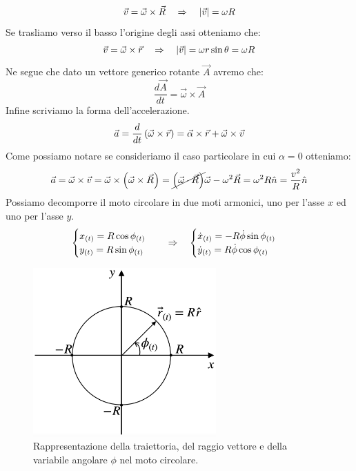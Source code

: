 \begin{equation}
    \vec v = \vec\omega\times\vec R\quad\Rightarrow\quad \left| \vec v \right|  = \omega R
\end{equation}
Se trasliamo verso il basso l'origine degli assi otteniamo che:
\begin{equation}
    \vec v = \vec\omega\times\vec r\quad\Rightarrow\quad \left| \vec v \right|  = \omega r\sin\theta = \omega R
\label{eq:v(w)}
\end{equation}
Ne segue che dato un vettore generico rotante $\vec A$ avremo che:
\begin{equation}
    \frac{d\vec A}{dt} = \vec\omega\times\vec A
\label{eq:rotantvector}
\end{equation}
Infine scriviamo la forma dell'accelerazione.
\begin{equation}
    \vec a = \frac d{dt}\left(\vec\omega\times\vec r\right) =
    \vec \alpha\times \vec r + \vec\omega\times\vec v
\label{eq:a_vec}
\end{equation}
Come possiamo notare se consideriamo il caso particolare in cui $\alpha = 0$
otteniamo:
\begin{equation}
    \vec a = \vec \omega\times\vec v = \vec \omega\times\left( \vec\omega\times
    \vec R\right) = \cancel{\left(\vec\omega\cdot\vec R\right)}\vec\omega - \omega^2\vec R
    = \omega^2R\hat n = \frac{v^2}R\hat n
\label{eq:an_vec}
\end{equation}
Possiamo decomporre il moto circolare in due moti armonici, uno per l'asse $x$ ed uno per l'asse $y$.
\begin{equation}
    \begin{cases}
        x_{(t)} = R\cos\phi_{(t)}\\
        y_{(t)} = R\sin\phi_{(t)}\\
    \end{cases}\quad\Rightarrow\quad
    \begin{cases}
        \dot x_{(t)} = -R\dot\phi\sin\phi_{(t)}\\
        \dot y_{(t)} = R\dot\phi\cos\phi_{(t)}
    \end{cases}
\label{fig:components}
\end{equation}

\begin{figure}[htbp]
    \centering
        \includegraphics[width=7cm]{images/circ.png}
        \caption{Rappresentazione della traiettoria, del raggio vettore e della variabile angolare $\phi$ nel moto circolare.}
\label{fig:circ}
\end{figure}